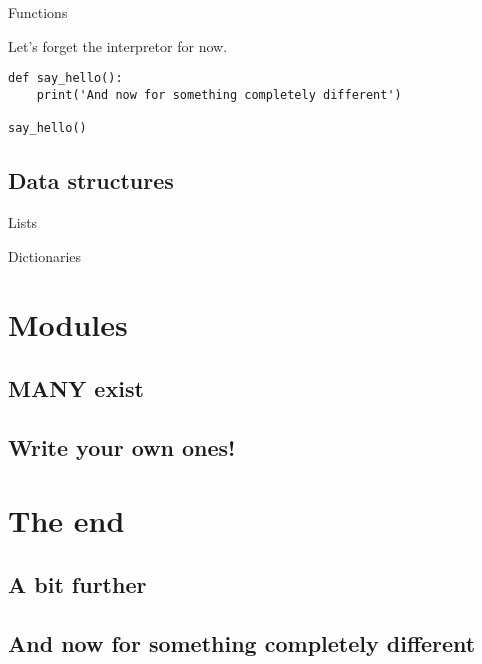 \documentclass[ignorenonframetext,]{beamer}
\begin{document}
\begin{frame}[fragile]{Functions}

    Let's forget the interpretor for now.

    \begin{verbatim}
def say_hello():
    print('And now for something completely different')

say_hello()
    \end{verbatim}
\end{frame}

\subsection{Data structures}
\begin{frame}{Lists}
\end{frame}

\begin{frame}{Dictionaries}
\end{frame}

\section{Modules}
\subsection{MANY exist}
\subsection{Write your own ones!}

\section{The end}
\subsection{A bit further}
\subsection{And now for something completely different}
\end{document}
